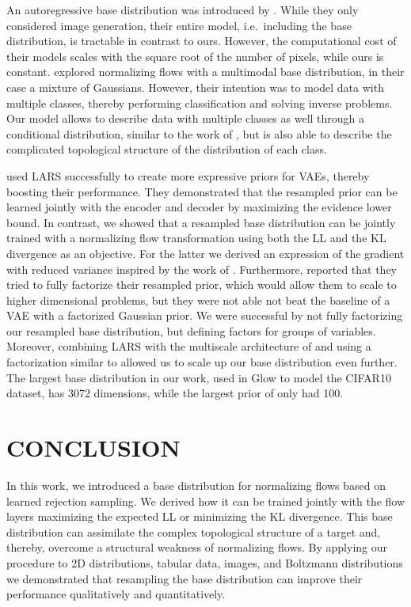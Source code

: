 \documentclass[twoside]{article}
\begin{document}
An autoregressive base distribution was introduced by \cite{Bhattacharyya2020}. While they only considered image generation, their entire model, i.e.\ including the base distribution, is tractable in contrast to ours. However, the computational cost of their models scales with the square root of the number of pixels, while ours is constant. \cite{Izmailov2020,Ardizzone2020,Hagemann2021} explored normalizing flows with a multimodal base distribution, in their case a mixture of Gaussians. However, their intention was to model data with multiple classes, thereby performing classification and solving inverse problems. Our model allows to describe data with multiple classes as well through a conditional distribution, similar to the work of \cite{Dinh2017,Kingma2018}, but is also able to describe the complicated topological structure of the distribution of each class.

\cite{Bauer2019} used LARS successfully to create more expressive priors for VAEs, thereby boosting their performance. They demonstrated that the resampled prior can be learned jointly with the encoder and decoder by maximizing the evidence lower bound. In contrast, we showed that a resampled base distribution can be jointly trained with a normalizing flow transformation using both the LL and the KL divergence as an objective. For the latter we derived an expression of the gradient with reduced variance inspired by the work of \cite{Grover2018b}. Furthermore, \cite{Bauer2019} reported that they tried to fully factorize their resampled prior, which would allow them to scale to higher dimensional problems, but they were not able not beat the baseline of a VAE with a factorized Gaussian prior. We were successful by not fully factorizing our resampled base distribution, but defining factors for groups of variables. Moreover, combining LARS with the multiscale architecture of \cite{Dinh2017} and using a factorization similar to \citep{Ma2019} allowed us to scale up our base distribution even further. The largest base distribution in our work, used in Glow to model the CIFAR10 dataset, has 3072 dimensions, while the largest prior of \cite{Bauer2019} only had 100.



\section{CONCLUSION}

In this work, we introduced a base distribution for normalizing flows based on learned rejection sampling. We derived how it can be trained jointly with the flow layers maximizing the expected LL or minimizing the KL divergence. This base distribution can assimilate the complex topological structure of a target and, thereby, overcome a structural weakness of normalizing flows. By applying our procedure to 2D distributions, tabular data, images, and Boltzmann distributions we demonstrated that resampling the base distribution can improve their performance qualitatively and quantitatively.
\end{document}
